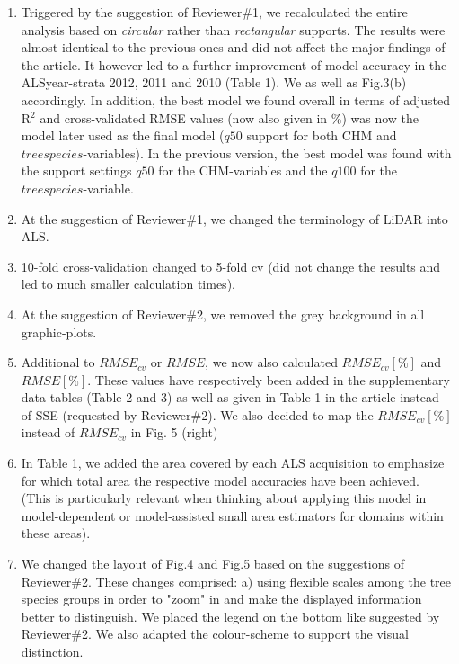 \documentclass{article}
\begin{document}
\begin{enumerate}


\item Triggered by the suggestion of Reviewer\#1, we recalculated the entire analysis based on \textit{circular} rather than \textit{rectangular} supports. The results were almost identical to the previous ones and did not affect the major findings of the article. It however led to a further improvement of model accuracy in the ALSyear-strata 2012, 2011 and 2010 (Table 1). We  as well as Fig.3(b) accordingly. In addition, the best model we found overall in terms of adjusted R$^2$ and cross-validated RMSE values (now also given in \%) was now the model later used as the final model ($q50$ support for both CHM and $treespecies$-variables). In the previous version, the best model was found with the support settings $q50$ for the CHM-variables and the $q100$ for the $treespecies$-variable.

\item At the suggestion of Reviewer\#1, we changed the terminology of LiDAR into ALS.

\item 10-fold cross-validation changed to 5-fold cv (did not change the results and led to much smaller calculation times).

\item At the suggestion of Reviewer\#2, we removed the grey background in all graphic-plots.

\item Additional to $RMSE_{cv}$ or $RMSE$, we now also calculated $RMSE_{cv}[\%]$ and $RMSE[\%]$. These values have respectively been added in the supplementary data tables (Table 2 and 3) as well as given in Table 1 in the article instead of SSE (requested by Reviewer\#2). We also decided to map the $RMSE_{cv}[\%]$ instead of $RMSE_{cv}$ in Fig. 5 (right)

\item In Table 1, we added the area covered by each ALS acquisition to emphasize for which total area the respective model accuracies have been achieved. (This is particularly relevant when thinking about applying this model in model-dependent or model-assisted small area estimators for domains within these areas).


\item We changed the layout of Fig.4 and Fig.5 based on the suggestions of Reviewer\#2. These changes comprised: a) using flexible scales among the tree species groups in order to "zoom" in and make the displayed information better to distinguish. We placed the legend on the bottom like suggested by Reviewer\#2. We also adapted the colour-scheme to support the visual distinction.













\end{enumerate}



\end{document}
